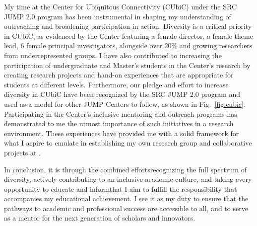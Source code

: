 My time at the Center for Ubiquitous Connectivity (CUbiC) under the SRC JUMP 2.0 program has been instrumental in shaping my understanding of outreaching and broadening participation in action. Diversity is a critical priority in CUbiC, as evidenced by the Center featuring a female director, a female theme lead, 6 female principal investigators, alongside over 20\% and growing researchers from underrepresented groups. I have also contributed to increasing the participation of undergraduate and Master's students in the Center's research by creating research projects and hand-on experiences that are appropriate for students at different levels. Furthermore, our pledge and effort to increase diversity in CUbiC have been recognized by the SRC JUMP 2.0 program and used as a model for other JUMP Centers to follow, as shown in Fig.~\ref{fig:cubic}. Participating in the Center's inclusive mentoring and outreach programs has demonstrated to me the utmost importance of such initiatives in a research environment. These experiences have provided me with a solid framework for what I aspire to emulate in establishing my own research group and collaborative projects at \appSchoolDeptShort{}.

In conclusion, it is through the combined efforts\textemdash recognizing the full spectrum of diversity, actively contributing to an inclusive academic culture, and taking every opportunity to educate and inform\textemdash that I aim to fulfill the responsibility that accompanies my educational achievement. I see it as my duty to ensure that the pathways to academic and professional success are accessible to all, and to serve as a mentor for the next generation of scholars and innovators.